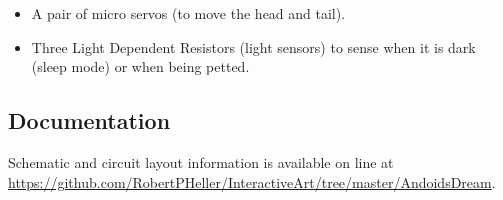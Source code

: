 \begin{itemize}
\item A pair of micro servos (to move the head and tail).
\item Three Light Dependent Resistors (light sensors) to sense when it is dark
(sleep mode) or when being petted.
\end{itemize}

\subsection*{Documentation}

Schematic and circuit layout information is available on line at 
\url{https://github.com/RobertPHeller/InteractiveArt/tree/master/AndoidsDream}.
